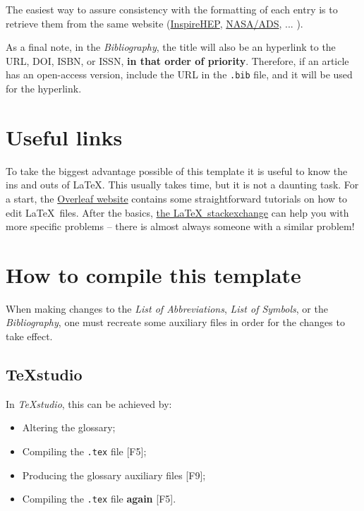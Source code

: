The easiest way to assure consistency with the formatting of each entry is to retrieve them from the same website (\href{https://inspirehep.net/}{InspireHEP}, \href{https://ui.adsabs.harvard.edu/}{NASA/ADS}, ... ).

As a final note, in the \textit{Bibliography}, the title will also be an hyperlink to the URL, DOI, ISBN, or ISSN, \textbf{in that order of priority}. Therefore, if an article has an open-access version, include the URL in the \texttt{.bib} file, and it will be used for the hyperlink.

\section{Useful links}
%
To take the biggest advantage possible of this template it is useful to know the ins and outs of \LaTeX. This usually takes time, but it is not a daunting task. For a start, the \href{https://www.overleaf.com/learn}{Overleaf website} contains some straightforward tutorials on how to edit \LaTeX\, files. After the basics, \href{https://tex.stackexchange.com}{the \LaTeX\, stackexchange} can help you with more specific problems -- there is almost always someone with a similar problem!

\section{How to compile this template}

When making changes to the \textit{List of Abbreviations}, \textit{List of Symbols}, or the \textit{Bibliography}, one must recreate some auxiliary files in order for the changes to take effect.

\subsection{TeXstudio}

\noindent In \textit{TeXstudio}, this can be achieved by:
\begin{itemize}
	\item Altering the glossary;
	\item Compiling the \texttt{.tex} file [F5];
	\item Producing the glossary auxiliary files [F9];
	\item Compiling the \texttt{.tex} file \textbf{again} [F5].
\end{itemize}

